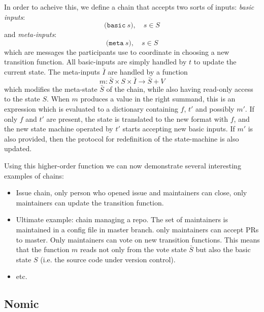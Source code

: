In order to acheive this, we define a chain that accepts two sorts of inputs:
\emph{basic inputs}:
\[
\mathtt{(basic} \ s), \quad s \in S
\]
and \emph{meta-inputs}:
\[
\mathtt{(meta} \ s), \quad s \in S
\]
which are messages the participants use to coordinate in choosing a new
transition function. All basic-inputs are simply handled by $t$ to update the
current state. The meta-inputs $\bar I$ are handled by a function
\[
m \colon \bar S \times S \times \bar I \to \bar S + V
\]
which modifies the meta-state $\bar S$ of the chain, while also having read-only
access to the state $S$. When $m$ produces a value in the right summand, this is
an expression which is evaluated to a dictionary containing $f$, $t'$ and
possibly $m'$. If only $f$ and $t'$ are present, the state is translated to the
new format with $f$, and the new state machine operated by $t'$ starts accepting
new basic inputs. If $m'$ is also provided, then the protocol for redefinition
of the state-machine is also updated.

Using this higher-order function we can now demonstrate several interesting
examples of chains:
\begin{itemize}
\item Issue chain, only person who opened issue and maintainers can close, only
  maintainers can update the transition function.
\item Ultimate example: chain managing a repo. The set of maintainers is
  maintained in a config file in master branch. only maintainers can accept PRs
  to master. Only maintainers can vote on new transition functions. This means
  that the function $m$ reads not only from the vote state $\bar S$ but also the
  basic state $S$ (i.e. the source code under version control).
\item etc.
\end{itemize}

\subsection{Nomic}
\label{s:examples}
